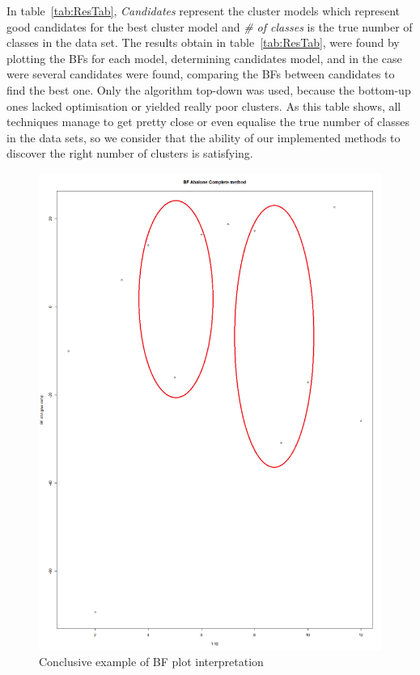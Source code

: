 \documentclass[twocolumn]{article}
\begin{document}
In table~\ref{tab:ResTab}, \emph{Candidates} represent the cluster models which represent good candidates for the best cluster model and \emph{\# of classes} is the true number of classes in the data set.
The results obtain in table~\ref{tab:ResTab}, were found by plotting the BFs for each model, determining candidates model, and in the case were several candidates were found, comparing the BFs between candidates to find the best one.
Only the algorithm top-down was used, because the bottom-up ones lacked optimisation or yielded really poor clusters.
As this table shows, all techniques manage to get pretty close or even equalise the true number of classes in the data sets, so we consider that the ability of our implemented methods to discover the right number of clusters is satisfying.
\begin{figure}[!]
    \centering
    \includegraphics[scale=0.3]{img/BFplot.png}
    \caption{Conclusive example of BF plot interpretation}
    \label{fig:BFplotConclusive}
\end{figure}
\end{document}
